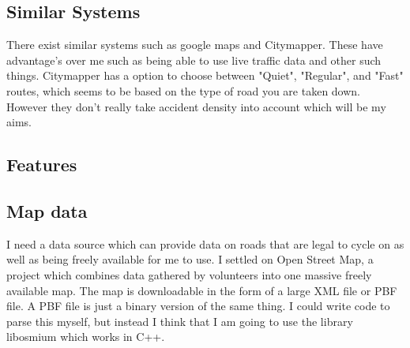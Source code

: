 \documentclass[11pt,twoside,a4paper]{article}
\begin{document}
\subsection{Similar Systems}
There exist similar systems such as google maps and Citymapper. These have advantage's over me such as being able to use live traffic data and other such things. Citymapper has a option to choose between "Quiet", "Regular", and "Fast" routes, which seems to be based on the type of road you are taken down.
However they don't really take accident density into account which will be my aims.
\subsection{Features}
\subsection{Map data}
I need a data source which can provide data on roads that are legal to cycle on as well as being freely available for me to use. I settled on Open Street Map, a project which combines data gathered by volunteers into one massive freely available map. The map is downloadable in the form of a large XML file or PBF file. A PBF file is just a binary version of the same thing. I could write code to parse this myself, but instead I think that I am going to use the library libosmium
which works in C++.
\end{document}
